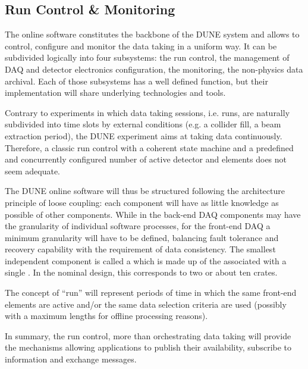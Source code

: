 
\subsection{Run Control \& Monitoring}
\label{sec:fd-daq-tcm}



The online software constitutes the backbone of the DUNE 
system and allows to control, configure and monitor the data taking in
a uniform way.
It can be subdivided logically into four subsystems: the run control,
the management of DAQ and detector electronics configuration, the monitoring, the non-physics data archival.
Each of those subsystems has a well defined function, but their
implementation will share underlying technologies and tools.

Contrary to experiments in which data taking sessions, i.e. runs, are
naturally subdivided into time slots by external conditions (e.g. a
collider fill, a beam extraction period), the DUNE experiment aims at
taking data continuously.
Therefore, a classic run control with a coherent state machine and a
predefined and concurrently configured number of active detector and
 elements does not seem adequate. 

The DUNE online software will thus be structured following the
architecture principle of loose coupling: each component will have as
little knowledge as possible of other components.
While in the back-end DAQ components may have the granularity of
individual software processes, for the front-end DAQ a minimum
granularity will have to be defined, balancing fault tolerance and
recovery capability with the requirement of data consistency.
The smallest independent component is called a  which
is made up of the  associated with a single
.
In the nominal design, this corresponds to two  
or about ten   crates.

The concept of ``run'' will represent periods of time in which the same
front-end elements are active and/or the same data selection criteria
are used (possibly with a maximum lengths for offline processing
reasons). 

In summary, the run control, more than orchestrating data taking will
provide the mechanisms allowing  applications to publish
their availability, subscribe to information and exchange messages. 

